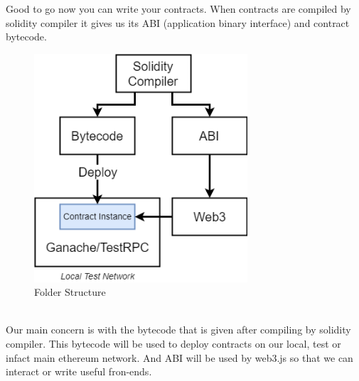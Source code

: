 Good to go now you can write your contracts. When contracts are compiled by solidity compiler it gives us its ABI (application binary interface) and contract bytecode. 
\begin{figure}[h]
	\centering
	\includegraphics[width=300px]{figures/Ethereum/09.png}
	\caption{Folder Structure}
	\label{fig:eth7}
\end{figure}
\\Our main concern is with the bytecode that is given after compiling by solidity compiler. This bytecode will be used to deploy contracts on our local, test or infact main ethereum network. And ABI will be used by web3.js so that we can interact or write useful fron-ends.